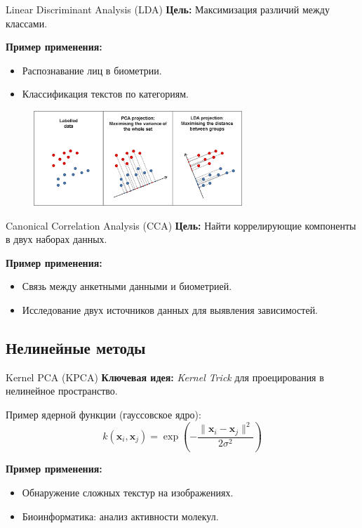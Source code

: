 \begin{frame}{Linear Discriminant Analysis (LDA)}
    \textbf{Цель:} Максимизация различий между классами.

    \textbf{Пример применения:}
    \begin{itemize}
        \item Распознавание лиц в биометрии.
        \item Классификация текстов по категориям.
    \end{itemize}

    \begin{figure}
        \includegraphics[width=0.7\textwidth]{../resources/methods/lda.png}
    \end{figure}
\end{frame}

\begin{frame}{Canonical Correlation Analysis (CCA)}
    \textbf{Цель:} Найти коррелирующие компоненты в двух наборах данных.

    \textbf{Пример применения:}
    \begin{itemize}
        \item Связь между анкетными данными и биометрией.
        \item Исследование двух источников данных для выявления зависимостей.
    \end{itemize}
\end{frame}

\subsection{Нелинейные методы}

\begin{frame}{Kernel PCA (KPCA)}
    \textbf{Ключевая идея:} \textit{Kernel Trick} для проецирования в нелинейное пространство.

    Пример ядерной функции (гауссовское ядро):
    \begin{equation*}
        k(\mathbf{x}_i, \mathbf{x}_j) = \exp\left(-\frac{\|\mathbf{x}_i - \mathbf{x}_j\|^2}{2\sigma^2}\right)
    \end{equation*}

    \textbf{Пример применения:}
    \begin{itemize}
        \item Обнаружение сложных текстур на изображениях.
        \item Биоинформатика: анализ активности молекул.
    \end{itemize}
\end{frame}


